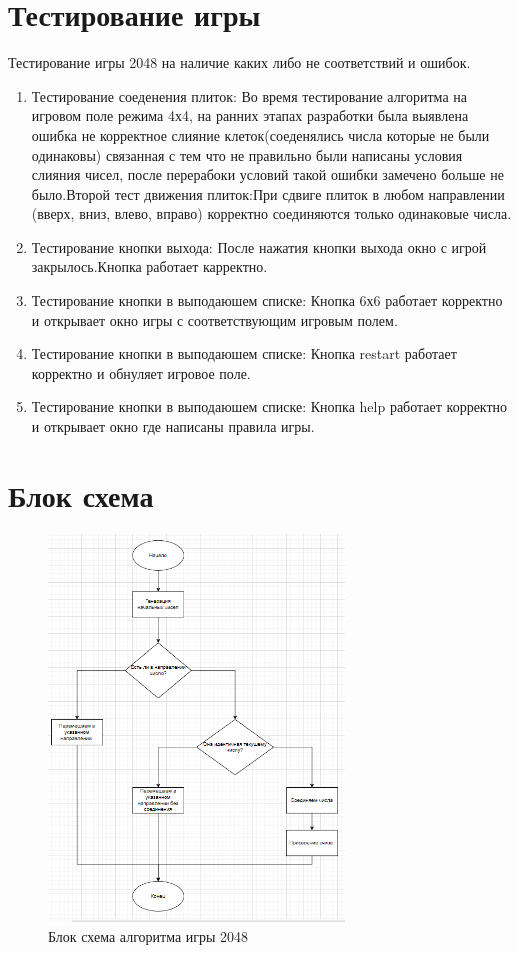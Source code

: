 \section{\label{subsec:ch01/sec01/sub01}Тестирование игры}
Тестирование игры 2048 на наличие каких либо не соответствий  и ошибок.
\begin{enumerate}
\item Тестирование соеденения плиток: Во время тестирование алгоритма на игровом поле режима 4х4, на ранних этапах разработки была выявлена ошибка не корректное слияние клеток(соеденялись числа которые не были одинаковы) связанная с тем что не правильно были написаны условия слияния чисел, после перерабоки условий такой ошибки замечено больше не было.Второй тест движения плиток:При сдвиге плиток в любом направлении (вверх, вниз, влево, вправо) корректно соединяются только одинаковые числа.

\item Тестирование кнопки выхода: После нажатия кнопки выхода окно с игрой закрылось.Кнопка работает карректно.
\item Тестирование кнопки в выподаюшем списке: Кнопка 6х6 работает корректно  и открывает окно игры с соответствующим игровым полем.
\item Тестирование кнопки в выподаюшем списке: Кнопка restart работает корректно  и  обнуляет игровое поле.
\item Тестирование кнопки в выподаюшем списке: Кнопка help работает корректно  и открывает окно где написаны правила игры.
\end{enumerate}    

\section{\label{subsec:ch01/sec01/sub01}Блок схема}
\begin{figure}[ht]
    \centering
    \includegraphics[width=0.7\textwidth]{images/7.png}
    \caption{Блок схема алгоритма игры 2048 }
    \label{fig:enter-label}
\end{figure}








